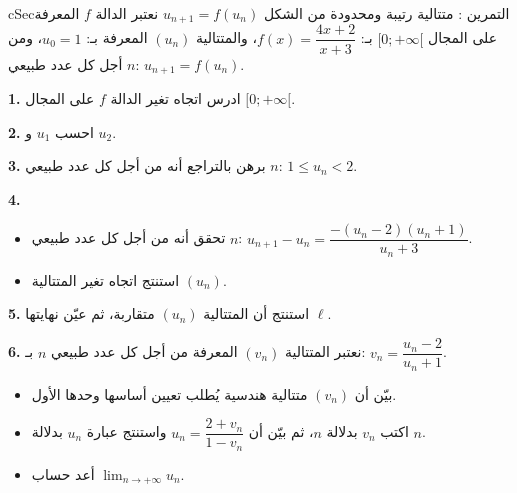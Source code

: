 \documentclass[12pt,a4paper]{article}
\newenvironment{BOX}[2]{\begin{otherlanguage}{english}\begin{arbox}{#1}{#2}}{\end{arbox}\end{otherlanguage}}
\newcounter{exo}
\newenvironment{tamrin}[1]{\stepcounter{exo}\begin{BOX}{cSec}{التمرين \theexo: #1}}{\end{BOX}}
\newcommand{\limn}{\displaystyle\lim_{n\to+\infty}}
\newenvironment{sq}{\begin{itemize}[leftmargin=2.4em,itemsep=3pt]}{\end{itemize}}
\newcommand{\qa}{\item[(أ)]}\newcommand{\qb}{\item[(ب)]}\newcommand{\qc}{\item[(جـ)]}\newcommand{\qd}{\item[(د)]}\newcommand{\qe}{\item[(هـ)]}
\newcommand{\QQ}[1]{\par\smallskip\textbf{#1.} }
\begin{document}
\begin{tamrin}{متتالية رتيبة ومحدودة من الشكل $u_{n+1}=f(u_n)$}
نعتبر الدالة $f$ المعرفة على المجال $[0;+\infty[$ بـ: $f(x)=\dfrac{4x+2}{x+3}$، والمتتالية $(u_n)$ المعرفة بـ: $u_0=1$، ومن أجل كل عدد طبيعي $n$: $u_{n+1}=f(u_n)$.
\QQ{1} ادرس اتجاه تغير الدالة $f$ على المجال $[0;+\infty[$.
\QQ{2} احسب $u_1$ و $u_2$.
\QQ{3} برهن بالتراجع أنه من أجل كل عدد طبيعي $n$: $1\leqslant u_n<2$.
\QQ{4}
\begin{sq}
\qa تحقق أنه من أجل كل عدد طبيعي $n$: $u_{n+1}-u_n=\dfrac{-(u_n-2)(u_n+1)}{u_n+3}$.
\qb استنتج اتجاه تغير المتتالية $(u_n)$.
\end{sq}
\QQ{5} استنتج أن المتتالية $(u_n)$ متقاربة، ثم عيّن نهايتها $\ell$.
\QQ{6} نعتبر المتتالية $(v_n)$ المعرفة من أجل كل عدد طبيعي $n$ بـ: $v_n=\dfrac{u_n-2}{u_n+1}$.
\begin{sq}
\qa بيّن أن $(v_n)$ متتالية هندسية يُطلب تعيين أساسها وحدها الأول.
\qb اكتب $v_n$ بدلالة $n$، ثم بيّن أن $u_n=\dfrac{2+v_n}{1-v_n}$ واستنتج عبارة $u_n$ بدلالة $n$.
\qc أعد حساب $\limn u_n$.
\end{sq}
\end{tamrin}
\end{document}
